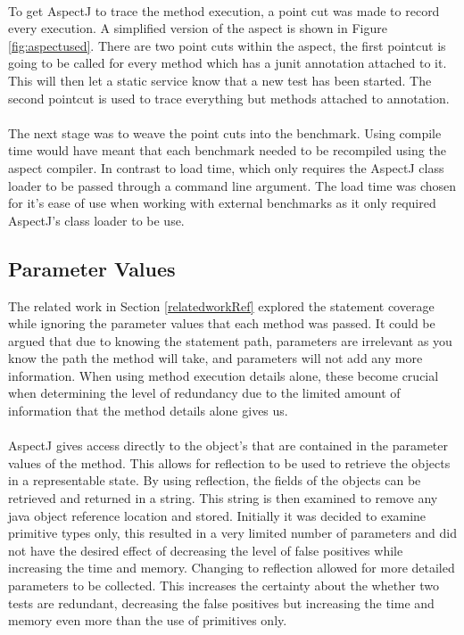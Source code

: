 \paragraph{}
To get AspectJ to trace the method execution, a point cut was made to record every execution. A simplified version of the aspect is shown in Figure \ref{fig:aspectused}. There are two point cuts within the aspect, the first pointcut is going to be called for every method which has a junit \@Test annotation attached to it. This will then let a static service know that a new test has been started. The second pointcut is used to trace everything but methods attached to \@Test annotation. 
\paragraph{}
The next stage was to weave the point cuts into the benchmark. Using compile time would have meant that each benchmark needed to be recompiled using the aspect compiler. In contrast to load time, which only requires the AspectJ class loader to be passed through a command line argument. The load time was chosen for it's ease of use when working with external benchmarks as it only required AspectJ's class loader to be use.

\subsection{Parameter Values}
The related work in Section \ref{relatedworkRef} explored the statement coverage while ignoring the parameter values that each method was passed. It could be argued that due to knowing the statement path, parameters are irrelevant as you know the path the method will take, and parameters will not add any more information. When using method execution details alone, these become crucial when determining the level of redundancy due to the limited amount of information that the method details alone gives us. 
\paragraph{}
AspectJ gives access directly to the object's that are contained in the parameter values of the method. This allows for reflection to be used to retrieve the objects in a representable state. By using reflection, the fields of the objects can be retrieved and returned in a string. This string is then examined to remove any java object reference location and stored. Initially it was decided to examine primitive types only, this resulted in a very limited number of parameters and did not have the desired effect of decreasing the level of false positives while increasing the time and memory. Changing to reflection allowed for more detailed parameters to be collected. This increases the certainty about the whether two tests are redundant, decreasing the false positives but increasing the time and memory even more than the use of primitives only. 
